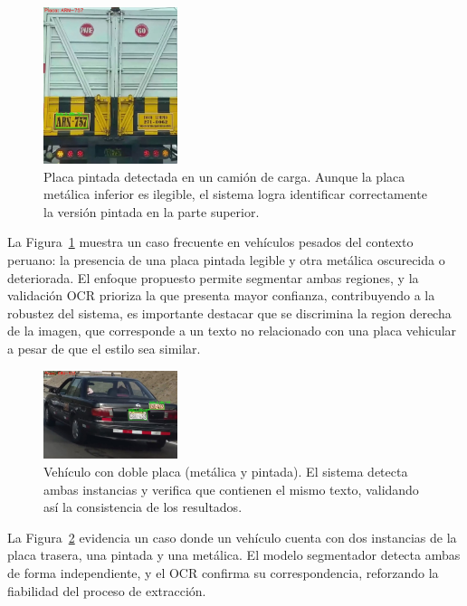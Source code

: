 \documentclass[conference]{IEEEtran}
\begin{document}
\begin{figure}[ht]
\centering
\includegraphics[width=0.35\textwidth]{figs/painted_plate_camion.jpeg}
\caption{Placa pintada detectada en un camión de carga. Aunque la placa metálica inferior es ilegible, el sistema logra identificar correctamente la versión pintada en la parte superior.}
\label{fig:painted_plate_camion}
\end{figure}

La Figura~\ref{fig:painted_plate_camion} muestra un caso frecuente en vehículos pesados del contexto peruano: la presencia de una placa pintada legible y otra metálica oscurecida o deteriorada. El enfoque propuesto permite segmentar ambas regiones, y la validación OCR prioriza la que presenta mayor confianza, contribuyendo a la robustez del sistema, es importante destacar que se discrimina la region derecha de la imagen, que corresponde a un texto no relacionado con una placa vehicular a pesar de que el estilo sea similar.

\begin{figure}[ht]
\centering
\includegraphics[width=0.35\textwidth]{figs/double_plate_taxi.jpeg}
\caption{Vehículo con doble placa (metálica y pintada). El sistema detecta ambas instancias y verifica que contienen el mismo texto, validando así la consistencia de los resultados.}
\label{fig:double_plate_taxi}
\end{figure}

La Figura~\ref{fig:double_plate_taxi} evidencia un caso donde un vehículo cuenta con dos instancias de la placa trasera, una pintada y una metálica. El modelo segmentador detecta ambas de forma independiente, y el OCR confirma su correspondencia, reforzando la fiabilidad del proceso de extracción.
\end{document}

